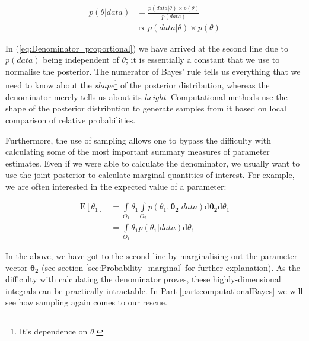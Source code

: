 \documentclass[11pt,fullpage]{book}
\begin{document}
\begin{equation}\label{eq:Denominator_proportional}
\begin{align}
p(\theta|data) &= \frac{p(data|\theta)\times p(\theta)}{p(data)}\\
&\propto p(data|\theta)\times p(\theta)
\end{align}
\end{equation}

In (\ref{eq:Denominator_proportional}) we have arrived at the second line due to $p(data)$ being independent of $\theta$; it is essentially a constant that we use to normalise the posterior. The numerator of Bayes' rule tells us everything that we need to know about the \textit{shape}\footnote{It's dependence on $\theta$.} of the posterior distribution, whereas the denominator merely tells us about its \textit{height}. Computational methods use the shape of the posterior distribution to generate samples from it based on local comparison of relative probabilities. 

Furthermore, the use of sampling allows one to bypass the difficulty with calculating some of the most important summary measures of parameter estimates. Even if we were able to calculate the denominator, we usually want to use the joint posterior to calculate marginal quantities of interest. For example, we are often interested in the expected value of a parameter:

\begin{equation}
\begin{align}
\mathrm{E}[\theta_1] &= \int\limits_{\Theta_1} \theta_1\int\limits_{\Theta_2} p(\theta_1,\boldsymbol{\theta_2}|data)\mathrm{d}\boldsymbol{\theta_2} \mathrm{d}\theta_1\\
&= \int\limits_{\Theta_1} \theta_1 p(\theta_1|data) \mathrm{d}\theta_1
\end{align}
\end{equation}

In the above, we have got to the second line by marginalising out the parameter vector $\boldsymbol{\theta_2}$ (see section \ref{sec:Probability_marginal} for further explanation). As the difficulty with calculating the denominator proves, these highly-dimensional integrals can be practically intractable. In Part \ref{part:computationalBayes} we will see how sampling again comes to our rescue.
\end{document}
